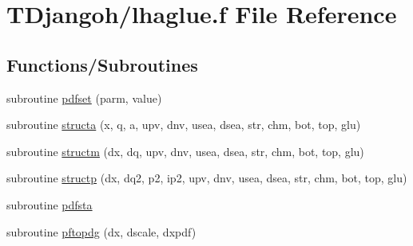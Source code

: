 \hypertarget{lhaglue_8f}{\section{T\+Djangoh/lhaglue.f File Reference}
\label{lhaglue_8f}
}
\subsection*{Functions/\+Subroutines}
\begin{DoxyCompactItemize}
\item 
subroutine \hyperlink{lhaglue_8f_aaa99fb39a556b02baf99bbc1a251050a}{pdfset} (parm, value)
\item 
subroutine \hyperlink{lhaglue_8f_affbeec06ae9e7c00e46b28b8dce5d1d5}{structa} (x, q, a, upv, dnv, usea, dsea, str, chm, bot, top, glu)
\item 
subroutine \hyperlink{lhaglue_8f_a48c73a508b0c249f810fcabae7e29b01}{structm} (dx, dq, upv, dnv, usea, dsea, str, chm, bot, top, glu)
\item 
subroutine \hyperlink{lhaglue_8f_ac9129e9599a2f7d78477bb112fce9ec5}{structp} (dx, dq2, p2, ip2, upv, dnv, usea, dsea, str, chm, bot, top, glu)
\item 
subroutine \hyperlink{lhaglue_8f_ac540d75e892d266bf9f81c2278314d30}{pdfsta}
\item 
subroutine \hyperlink{lhaglue_8f_a3ac5221acf946b2057ae65d0bd9b607a}{pftopdg} (dx, dscale, dxpdf)
\end{DoxyCompactItemize}


